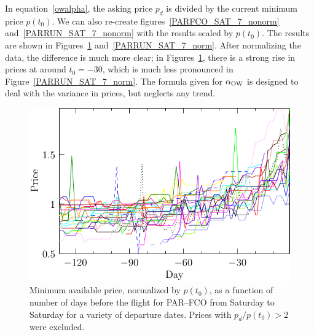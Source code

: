 \documentclass{article}
\def\aow{\alpha_{\rm{OW}}}
\begin{document}
In equation~\eqref{owalpha}, the asking price $p_d$ is divided by the
current minimum price $p(t_0)$.  We can also re-create
figures~\ref{PARFCO_SAT_7_nonorm} and~\ref{PARRUN_SAT_7_nonorm} with
the results scaled by $p(t_0)$.  The results are shown in
Figures~\ref{PARFCO_SAT_7_norm} and~\ref{PARRUN_SAT_7_norm}.  After
normalizing the data, the difference is much more clear; in
Figures~\ref{PARFCO_SAT_7_norm}, there is a strong rise in prices at
around $t_0=-30$, which is much less pronounced in
Figure~\ref{PARRUN_SAT_7_norm}.  The formula given for $\aow$ is
designed to deal with the variance in prices, but neglects any trend.
\begin{figure}
  \begin{center}
    \includegraphics{pdf/PARFCO_SAT_7_norm}
    \caption{Minimum available price, normalized by $p(t_0)$, as a
      function of number of days before the flight for PAR--FCO from
      Saturday to Saturday for a variety of departure dates. Prices
      with $p_d/p(t_0) > 2$ were excluded.}
    \label{PARFCO_SAT_7_norm}
  \end{center}
\end{figure}
\end{document}

